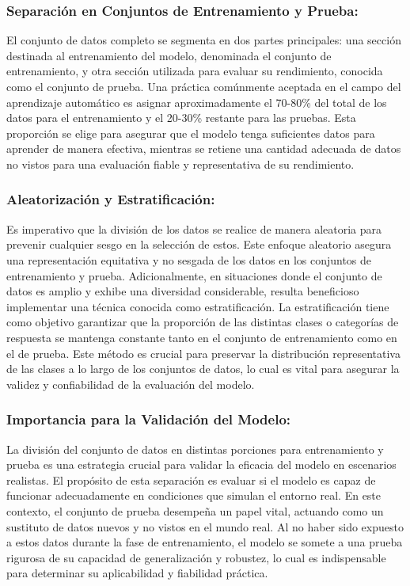 \subsubsection{Separación en Conjuntos de Entrenamiento y Prueba:}
El conjunto de datos completo se segmenta en dos partes principales: una sección destinada al entrenamiento del modelo, denominada el conjunto de entrenamiento, y otra sección utilizada para evaluar su rendimiento, conocida como el conjunto de prueba. Una práctica comúnmente aceptada en el campo del aprendizaje automático es asignar aproximadamente el 70-80\% del total de los datos para el entrenamiento y el 20-30\% restante para las pruebas. Esta proporción se elige para asegurar que el modelo tenga suficientes datos para aprender de manera efectiva, mientras se retiene una cantidad adecuada de datos no vistos para una evaluación fiable y representativa de su rendimiento.

\subsubsection{Aleatorización y Estratificación:}
Es imperativo que la división de los datos se realice de manera aleatoria para prevenir cualquier sesgo en la selección de estos. Este enfoque aleatorio asegura una representación equitativa y no sesgada de los datos en los conjuntos de entrenamiento y prueba. Adicionalmente, en situaciones donde el conjunto de datos es amplio y exhibe una diversidad considerable, resulta beneficioso implementar una técnica conocida como estratificación. La estratificación tiene como objetivo garantizar que la proporción de las distintas clases o categorías de respuesta se mantenga constante tanto en el conjunto de entrenamiento como en el de prueba. Este método es crucial para preservar la distribución representativa de las clases a lo largo de los conjuntos de datos, lo cual es vital para asegurar la validez y confiabilidad de la evaluación del modelo.

\subsubsection{Importancia para la Validación del Modelo:}
La división del conjunto de datos en distintas porciones para entrenamiento y prueba es una estrategia crucial para validar la eficacia del modelo en escenarios realistas. El propósito de esta separación es evaluar si el modelo es capaz de funcionar adecuadamente en condiciones que simulan el entorno real. En este contexto, el conjunto de prueba desempeña un papel vital, actuando como un sustituto de datos nuevos y no vistos en el mundo real. Al no haber sido expuesto a estos datos durante la fase de entrenamiento, el modelo se somete a una prueba rigurosa de su capacidad de generalización y robustez, lo cual es indispensable para determinar su aplicabilidad y fiabilidad práctica.


